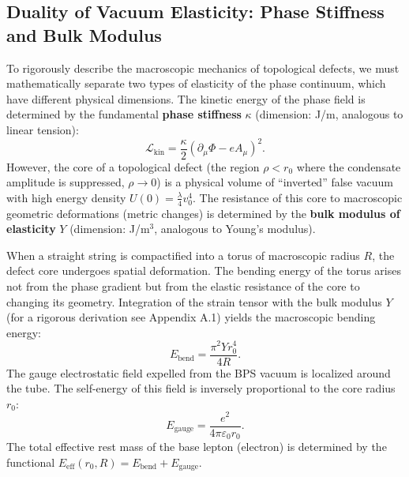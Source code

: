 \documentclass[11pt,a4paper]{article}
\begin{document}
\subsection{Duality of Vacuum Elasticity: Phase Stiffness and Bulk Modulus}
To rigorously describe the macroscopic mechanics of topological defects, we must mathematically separate two types of elasticity of the phase continuum, which have different physical dimensions.
The kinetic energy of the phase field is determined by the fundamental \textbf{phase stiffness} $\kappa$ (dimension: J/m, analogous to linear tension):
\begin{equation}
\mathcal{L}_{\text{kin}} = \frac{\kappa}{2} (\partial_\mu \Phi - e A_\mu)^2.
\end{equation}
However, the core of a topological defect (the region $\rho < r_0$ where the condensate amplitude is suppressed, $\rho \to 0$) is a physical volume of ``inverted'' false vacuum with high energy density $U(0) = \frac{\lambda}{4}v_0^4$. The resistance of this core to macroscopic geometric deformations (metric changes) is determined by the \textbf{bulk modulus of elasticity} $Y$ (dimension: J/m$^3$, analogous to Young's modulus).

When a straight string is compactified into a torus of macroscopic radius $R$, the defect core undergoes spatial deformation. The bending energy of the torus arises not from the phase gradient but from the elastic resistance of the core to changing its geometry. Integration of the strain tensor with the bulk modulus $Y$ (for a rigorous derivation see Appendix A.1) yields the macroscopic bending energy:
\begin{equation}
E_{\text{bend}} = \frac{\pi^2 Y r_0^4}{4 R}.
\end{equation}
The gauge electrostatic field expelled from the BPS vacuum is localized around the tube. The self-energy of this field is inversely proportional to the core radius $r_0$:
\begin{equation}
E_{\text{gauge}} = \frac{e^2}{4\pi\varepsilon_0 r_0}.
\end{equation}
The total effective rest mass of the base lepton (electron) is determined by the functional $E_{\text{eff}}(r_0, R) = E_{\text{bend}} + E_{\text{gauge}}$.
\end{document}

